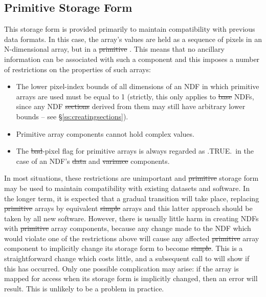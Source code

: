 \subsection{\label{ss:implicitformchange}\label{ss:primitiveform}Primitive Storage Form}

This storage form is provided primarily to maintain compatibility with
previous data formats. 
In this case, the array's values are held as a sequence of pixels in an
N-dimensional array, but in a \st{primitive\/} .
This means that no ancillary information can be associated with such a
component and this imposes a number of restrictions on the properties of
such arrays: 

\begin{itemize}

\item
The lower pixel-index bounds of all dimensions of an NDF in which primitive
arrays are used must be equal to 1 (strictly, this only applies to \st{base\/} NDFs, since any NDF \st{sections\/} derived from them may still have
arbitrary lower bounds -- see \S\ref{ss:creatingsections}). 

\item
Primitive array components cannot hold complex values.

\item
The \st{bad\/}-pixel flag for primitive arrays is always regarded as
.TRUE.\ in the case of an NDF's \st{data\/} and \st{variance\/}
components.

\end{itemize}

In most situations, these restrictions are unimportant and \st{primitive\/}
storage form may be used to maintain compatibility with existing datasets
and software. 
In the longer term, it is expected that a gradual transition will take
place, replacing \st{primitive\/} arrays by equivalent \st{simple\/} arrays
and this latter approach should be taken by all new software.
However, there is usually little harm in creating NDFs with
\st{primitive\/} array components, because any change made to the NDF
which 
would violate one of the restrictions above will cause any affected
\st{primitive\/} array component to implicitly change its storage form
to become 
\st{simple}. 
This is a straightforward change which costs little, and a subsequent call
to  will show if this has occurred. 
Only one possible complication may arise: if the array is mapped for access
when its storage form is implicitly changed, then an error will result. 
This is unlikely to be a problem in practice.

